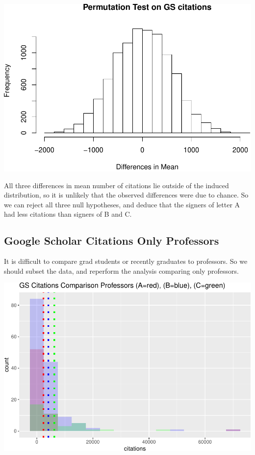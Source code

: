 \documentclass[]{article}
\begin{document}
\includegraphics{final_files/figure-latex/unnamed-chunk-58-1.pdf}

All three differences in mean number of citations lie outside of the
induced distribution, so it is unlikely that the observed differences
were due to chance. So we can reject all three null hypotheses, and
deduce that the signers of letter A had less citations than signers of B
and C.

\hypertarget{google-scholar-citations-only-professors}{%
\subsection{Google Scholar Citations Only
Professors}\label{google-scholar-citations-only-professors}}

It is difficult to compare grad students or recently graduates to
professors. So we should subset the data, and reperform the analysis
comparing only professors.

\includegraphics{final_files/figure-latex/unnamed-chunk-59-1.pdf}
\end{document}
